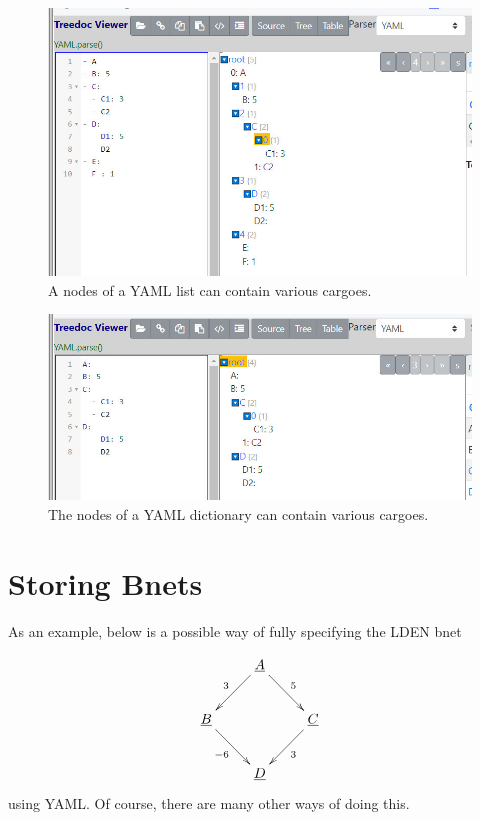 \begin{figure}[h!]
\centering
\includegraphics[width=6in]
{yaml/yaml-list-nodes.jpg}
\caption{A nodes of a YAML list can contain various cargoes.}
\label{fig-yaml-list-nodes}
\end{figure}

\begin{figure}[h!]
\centering
\includegraphics[width=6in]
{yaml/yaml-dict-nodes.jpg}
\caption{The nodes of a YAML dictionary can contain various cargoes. }
\label{fig-yaml-dict-nodes}
\end{figure}

\section{Storing Bnets}

As an example, below is a
possible way of
fully specifying the LDEN bnet 

$$
\xymatrix{
&\ul{A}\ar[dl]_3\ar[dr]^5
\\
\ul{B}\ar[dr]_{-6} & &\ul{C}\ar[dl]^{3} \\
&\ul{D}
}
$$
using YAML. Of course,
there are
many other ways of
doing this.

